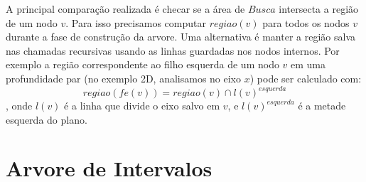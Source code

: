 A principal \cite{knuth} comparação realizada é checar se a área de \(Busca\) intersecta a região
de um nodo \(v\). Para isso precisamos computar \(regiao(v)\) para todos os nodos \(v\)
durante a fase de construção da arvore.
Uma alternativa é manter a região salva nas chamadas recursivas usando as linhas guardadas
nos nodos internos. Por exemplo a região correspondente ao filho esquerda de um nodo
\(v\) em uma profundidade par (no exemplo 2D, analisamos no eixo \(x\)) pode ser calculado com:
\[
    regiao(fe(v)) = regiao(v) \cap l(v)^{esquerda}
\],
onde \(l(v)\) é a linha que divide o eixo salvo em \(v\), e \(l(v)^{esquerda}\) é a metade
esquerda do plano.


\section{Arvore de Intervalos}



